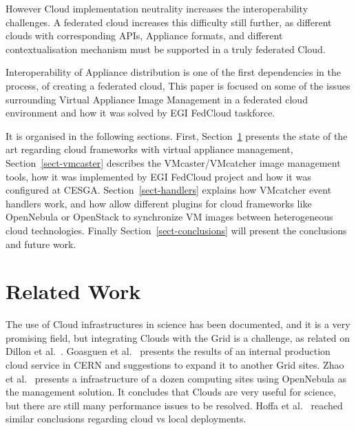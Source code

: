 \documentclass{llncs_Ibergrid2013}
\begin{document}
However Cloud implementation neutrality increases the interoperability challenges. A federated cloud increases this difficulty still further, as different clouds with corresponding APIs, Appliance formats, and different contextualisation mechanism must be supported in a truly federated Cloud. 

Interoperability of Appliance distribution is one of the first dependencies in the process, of creating a federated cloud, This paper is focused on some of the issues surrounding Virtual Appliance Image Management in a federated cloud environment and how it was solved by EGI FedCloud taskforce.

It is organised in the following sections. First, Section~\ref{sect-relatedwork} presents the state of the art regarding cloud frameworks with virtual appliance management, Section~\ref{sect-vmcaster} describes the VMcaster/VMcatcher image management tools, how it was implemented by EGI FedCloud project and how it was configured at CESGA. 
Section~\ref{sect-handlers} explains how VMcatcher event handlers work, and how allow different plugins for cloud frameworks like OpenNebula or OpenStack to synchronize VM images between heterogeneous cloud technologies. 
Finally Section~\ref{sect-conclusions} will present the conclusions and future work.  



\section{Related Work}
\label{sect-relatedwork}
The use of Cloud infrastructures in science has been documented, and it is a very promising field, but integrating Clouds with the Grid is a challenge, as related on Dillon et al.~\cite{Dillon2010}. Goasguen et al.~\cite{Goasguen2012} presents the results of an internal production cloud service in CERN and suggestions to expand it to another Grid sites. Zhao et al.~\cite{Zhao2012} presents a infrastructure of a dozen computing sites using OpenNebula as the management solution. It concludes that Clouds are very useful for science, but there are still many performance issues to be resolved. Hoffa et al.~\cite{Hoffa2008} reached similar conclusions regarding cloud vs local deployments.
\end{document}
